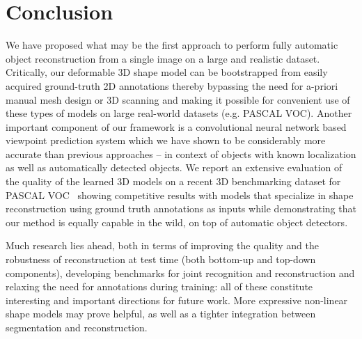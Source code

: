 \section{Conclusion}
We have proposed what may be the first approach to perform fully automatic object reconstruction from a single image on a large and realistic dataset. Critically, our deformable 3D shape model can be bootstrapped from easily acquired ground-truth 2D annotations thereby bypassing the need for a-priori manual mesh design or 3D scanning and making it possible for convenient use of these types of models on large real-world datasets (e.g. PASCAL VOC). Another important component of our framework is a convolutional neural network based viewpoint prediction system which we have shown to be considerably more accurate than previous approaches -- in context of objects with known localization as well as automatically detected objects. We report an extensive evaluation of the quality of the learned 3D models on a recent 3D benchmarking dataset for PASCAL VOC~\cite{pascal3d} showing competitive results with models that specialize in shape reconstruction using ground truth annotations as inputs while demonstrating that our method is equally capable in the wild, on top of automatic object detectors. %


Much research lies ahead, both in terms of improving the quality and the robustness of reconstruction at test time (both bottom-up and top-down components), developing benchmarks for joint recognition and reconstruction and relaxing the need for annotations during training: all of these constitute interesting and important directions for future work. More expressive non-linear shape models \cite{wu20143d} may prove helpful, as well as a tighter integration between segmentation and reconstruction. %



